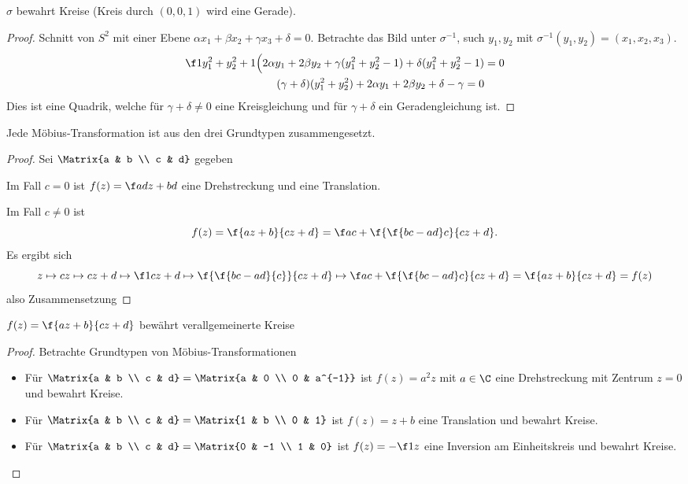 \begin{lem}
	$\sigma$ bewahrt Kreise (Kreis durch $(0,0,1)$ wird eine Gerade).
	\begin{proof}
		Schnitt von $S^2$ mit einer Ebene $\alpha x_1 + \beta x_2 + \gamma x_3 + \delta = 0$.
		Betrachte das Bild unter $\sigma^{-1}$, such $y_1, y_2$ mit $\sigma^{-1}(y_1, y_2) = (x_1, x_2, x_3)$.
		\begin{align*}
			\f 1{y_1^2 + y_2^2 + 1} \Big( 2 \alpha y_1 + 2 \beta y_2 + \gamma (y_1^2 + y_2^2 - 1) + \delta (y_1^2 + y_2^2 - 1) &= 0 \\
			(\gamma + \delta)(y_1^2 + y_2^2) + 2 \alpha y_1 + 2 \beta y_2 + \delta - \gamma = 0
		\end{align*}
		Dies ist eine Quadrik, welche für $\gamma + \delta \neq 0$ eine Kreisgleichung und für $\gamma + \delta$ ein Geradengleichung ist.
	\end{proof}
\end{lem}

\begin{lem}
	Jede Möbius-Transformation ist aus den drei Grundtypen zusammengesetzt.
	\begin{proof}
		Sei $\Matrix{a & b \\ c & d}$ gegeben

		Im Fall $c = 0$ ist $f(z) = \f a d z + bd$ eine Drehstreckung und eine Translation.

		Im Fall $c \neq 0$ ist
		\[
			f(z) = \f {az + b}{cz + d}
			= \f ac + \f {\f {bc - ad}c}{cz + d}.
		\]
		Es ergibt sich
		\[
			z \mapsto c z \mapsto c z + d \mapsto \f 1{cz + d} \mapsto \f{\f{bc - ad}{c}}{cz + d} \mapsto \f ac + \f{\f{bc-ad}c}{cz+d} = \f {az + b}{cz + d} = f(z)
		\]
		also Zusammensetzung
	\end{proof}
\end{lem}

\begin{lem}
	$f(z) = \f {az + b} {cz + d}$ bewährt verallgemeinerte Kreise
	\begin{proof}
		Betrachte Grundtypen von Möbius-Transformationen
		\begin{itemize}
			\item
				Für $\Matrix{a & b \\ c & d} = \Matrix{a & 0 \\ 0 & a^{-1}}$ ist $f(z) = a^2 z$ mit $a \in \C$ eine Drehstreckung mit Zentrum $z=0$ und bewahrt Kreise.
			\item
				Für $\Matrix{a & b \\ c & d} = \Matrix{1 & b \\ 0 & 1}$ ist $f(z) = z + b$ eine Translation und bewahrt Kreise.
			\item
				Für $\Matrix{a & b \\ c & d} = \Matrix{0 & -1 \\ 1 & 0}$ ist $f(z) = - \f 1z$ eine Inversion am Einheitskreis und bewahrt Kreise.
		\end{itemize}
	\end{proof}
\end{lem}

